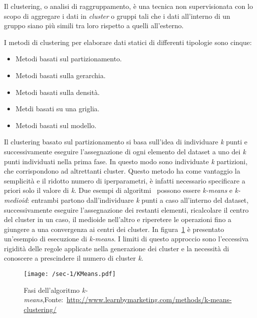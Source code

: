 Il clustering, o analisi di raggruppamento, è una tecnica non supervisionata con lo scopo di aggregare i dati in \textit{cluster} o gruppi
tali che i dati all'interno di un gruppo siano più simili tra loro rispetto a quelli all'esterno\cite{liao2005clustering, zazzarro2009clustering}.

I metodi di clustering per elaborare dati statici di differenti tipologie sono cinque:

\begin{itemize}
  \item Metodi basati sul partizionamento.
  \item Metodi basati sulla gerarchia.
  \item Metodi basati sulla densità.
  \item Metdi basati su una griglia.
  \item Metodi basati sul modello.
\end{itemize}

Il clustering basato sul partizionamento si basa sull'idea di individuare \textit{k} punti e successivamente
eseguire l'assegnazione di ogni elemento del dataset a uno dei \textit{k} punti individuati nella prima fase.
In questo modo sono individuate \textit{k} partizioni, che corrispondono ad altrettanti cluster.
Questo metodo ha come vantaggio la semplicità e il ridotto numero di iperparametri,
è infatti necessario specificare a priori solo il valore di \textit{k}.
Due esempi di algoritmi~\cite{arora2016analysis} possono essere \textit{k-means} e \textit{k-medioid}:
entrambi partono dall'individuare \textit{k} punti a caso all'interno del dataset, successivamente eseguire l'assegnazione dei restanti elementi,
ricalcolare il centro del cluster in un caso, il medioide nell'altro e riperetere le operazioni fino a giungere a una convergenza ai centri dei cluster.
In figura~\cref{fig:chap-1:k-means-overview} è presentato un'esempio di esecuzione di \textit{k-means}.
I limiti di questo approccio sono l'eccessiva rigidità delle regole applicate nella generazione dei cluster e la necessità di conoscere a prescindere il numero di cluster \textit{k}.

\begin{figure}
  \centering
  \texttt{[image: /sec-1/KMeans.pdf]}
  \caption{Fasi dell'algoritmo \textit{k-means},Fonte:~\url{http://www.learnbymarketing.com/methods/k-means-clustering/}}%
  \label{fig:chap-1:k-means-overview}
\end{figure}

